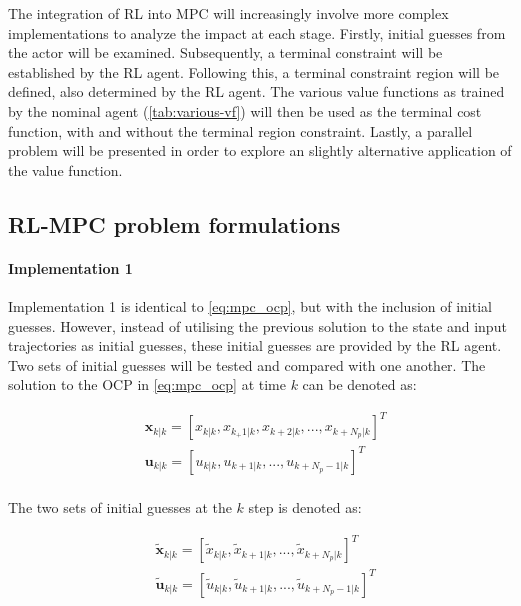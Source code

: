 The integration of RL into MPC will increasingly involve more complex implementations to analyze the impact at each stage. Firstly, initial guesses from the actor will be examined. Subsequently, a terminal constraint will be established by the RL agent. Following this, a terminal constraint region will be defined, also determined by the RL agent. The various value functions as trained by the nominal agent (\autoref{tab:various-vf}) will then be used as the terminal cost function, with and without the terminal region constraint. Lastly, a parallel problem will be presented in order to explore an slightly alternative application of the value function.

\subsection{RL-MPC problem formulations}

\paragraph{Implementation 1}
Implementation 1 is identical to \autoref{eq:mpc_ocp}, but with the inclusion of initial guesses. However, instead of utilising the previous solution to the state and input trajectories as initial guesses, these initial guesses are provided by the RL agent. Two sets of initial guesses will be tested and compared with one another. The solution to the OCP in \autoref{eq:mpc_ocp} at time $k$  can be denoted as:

\begin{equation}\label{eq:sol-mpc-ocp}
	\begin{aligned}
		&\mathbf{x}_{k|k} = [x_{k|k},x_{k_+ 1|k},x_{k + 2|k}, ...,x_{k + N_p|k}]^T \\ 
		&\mathbf{u}_{k|k} = [u_{k|k},u_{k + 1|k}, ...,u_{k + N_p-1|k}]^T \\
	\end{aligned}
\end{equation}

The two sets of initial guesses at the $k$ step is denoted as:

\begin{equation}\label{eq:initial-guess-1}
	\begin{aligned}
		&\tilde{\mathbf{x}}_{k|k} = [\tilde{x}_{k|k},\tilde{x}_{k+1|k},...,\tilde{x}_{k + N_p|k}]^T \\ 
		&\tilde{\mathbf{u}}_{k|k} = [\tilde{u}_{k|k},\tilde{u}_{k + 1|k},...,\tilde{u}_{k + N_p - 1|k}]^T\\ 
	\end{aligned}
\end{equation}

